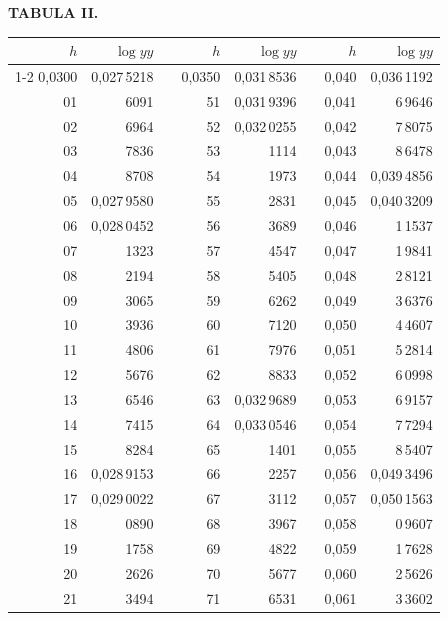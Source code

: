 \endgroup
\clearpage
{}
\begingroup
\centering
\fontsize{9}{9}\selectfont
\setlength{\tabcolsep}{8pt}
\renewcommand{\arraystretch}{1}
\setlength{\parskip}{0pt}
\textbf{TABULA II.}
\par\vspace{7pt}
\begin{tabular}{|r|r|@{}p{9pt}@{}|r|r|@{}p{9pt}@{}|r|r|}
\hline
\(h\) & \(\log yy\) & & \(h\) & \(\log yy\) & & \(h\) & \(\log yy\) \\
\cline{1-2}\cline{4-5}\cline{7-8}
0,0300 & 0,027\,5218 &  & 0,0350 & 0,031\,8536 &  & 0,040 & 0,036\,1192 \\
01 & 6091 &  & 51 & 0,031\,9396 &  & 0,041 & 6\,9646 \\
02 & 6964 &  & 52 & 0,032\,0255 &  & 0,042 & 7\,8075 \\
03 & 7836 &  & 53 & 1114 &  & 0,043 & 8\,6478 \\
04 & 8708 &  & 54 & 1973 &  & 0,044 & 0,039\,4856 \\
05 & 0,027\,9580 &  & 55 & 2831 &  & 0,045 & 0,040\,3209 \\[3pt]
06 & 0,028\,0452 &  & 56 & 3689 &  & 0,046 & 1\,1537 \\
07 & 1323 &  & 57 & 4547 &  & 0,047 & 1\,9841 \\
08 & 2194 &  & 58 & 5405 &  & 0,048 & 2\,8121 \\
09 & 3065 &  & 59 & 6262 &  & 0,049 & 3\,6376 \\
10 & 3936 &  & 60 & 7120 &  & 0,050 & 4\,4607 \\[3pt]
11 & 4806 &  & 61 & 7976 &  & 0,051 & 5\,2814 \\
12 & 5676 &  & 62 & 8833 &  & 0,052 & 6\,0998 \\
13 & 6546 &  & 63 & 0,032\,9689 &  & 0,053 & 6\,9157 \\
14 & 7415 &  & 64 & 0,033\,0546 &  & 0,054 & 7\,7294 \\
15 & 8284 &  & 65 & 1401 &  & 0,055 & 8\,5407 \\[3pt]
16 & 0,028\,9153 &  & 66 & 2257 &  & 0,056 & 0,049\,3496 \\
17 & 0,029\,0022 &  & 67 & 3112 &  & 0,057 & 0,050\,1563 \\
18 & 0890 &  & 68 & 3967 &  & 0,058 & 0\,9607 \\
19 & 1758 &  & 69 & 4822 &  & 0,059 & 1\,7628 \\
20 & 2626 &  & 70 & 5677 &  & 0,060 & 2\,5626 \\[3pt]
21 & 3494 &  & 71 & 6531 &  & 0,061 & 3\,3602 \\

\end{tabular}
